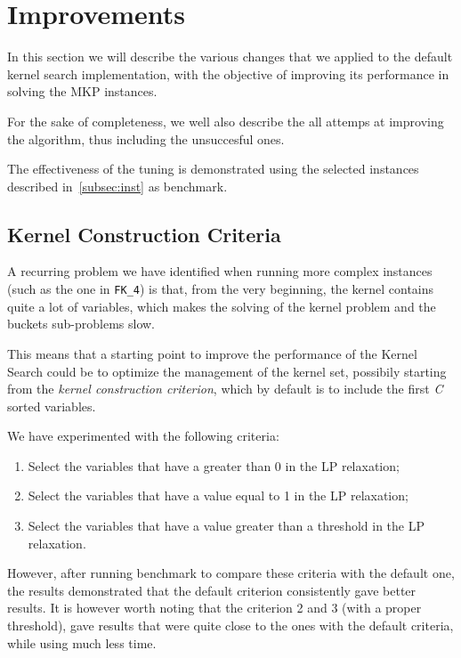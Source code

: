 \chapter{Improvements}\label{ch:improvements}
In this section we will describe the various changes
that we applied to the default kernel search implementation,
with the objective of improving its performance
in solving the MKP instances.

For the sake of completeness, we well also describe the all attemps at improving
the algorithm, thus including the unsuccesful ones.

The effectiveness of the tuning is demonstrated using the selected instances
described in~\ref{subsec:inst} as benchmark.




\section{Kernel Construction Criteria}
A recurring problem we have identified when running more complex
instances (such as the one in \texttt{FK\_4}) is that,
from the very beginning, the kernel contains quite a lot of variables,
which makes the solving of the kernel problem and the buckets sub-problems slow.

This means that a starting point to improve the performance of the Kernel Search
could be to optimize the management of the kernel set,
possibily starting from the \textit{kernel construction criterion},
which by default is to include the first \textit{C} sorted variables.

We have experimented with the following criteria:
\begin{enumerate}
    \item Select the variables that have a greater than 0 in the LP relaxation;
    \item Select the variables that have a value equal to 1 in the LP relaxation;
    \item Select the variables that have a value greater than a threshold in the LP relaxation.
\end{enumerate}

However, after running benchmark to compare these criteria
with the default one, the results demonstrated that the default criterion
consistently gave better results.
It is however worth noting that the criterion 2 and 3 (with a proper threshold),
gave results that were quite close to the ones with the default criteria,
while using much less time.


